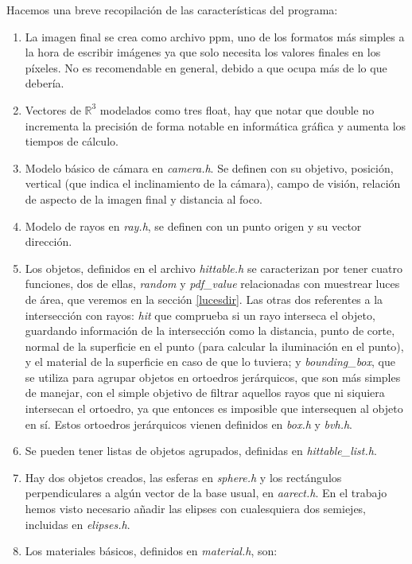 \documentclass{scrbook}
\begin{document}
Hacemos una breve recopilación de las características del programa:
\begin{enumerate}
	\item La imagen final se crea como archivo ppm, uno de los formatos más simples a la hora de escribir imágenes ya que solo necesita los valores finales en los píxeles. No es recomendable en general, debido a que ocupa más de lo que debería.
	\item Vectores de $\mathds{R}^3$ modelados como tres float, hay que notar que double no incrementa la precisión de forma notable en informática gráfica y aumenta los tiempos de cálculo.
	\item Modelo básico de cámara en \textit{camera.h}. Se definen con su objetivo, posición, vertical (que indica el inclinamiento de la cámara), campo de visión, relación de aspecto de la imagen final y distancia al foco.
	\item Modelo de rayos en \textit{ray.h}, se definen con un punto origen y su vector dirección.
	\item Los objetos, definidos en el archivo \textit{hittable.h} se caracterizan por tener cuatro funciones, dos de ellas, \textit{random} y \textit{pdf\_value}  relacionadas con muestrear luces de área, que veremos en la sección \ref{lucesdir}. Las otras dos referentes a la intersección con rayos: \textit{hit} que comprueba si un rayo interseca el objeto, guardando información de la intersección como la distancia, punto de corte, normal de la superficie en el punto (para calcular la iluminación en el punto), y el material de la superficie en caso de que lo tuviera; y \textit{bounding\_box}, que se utiliza para agrupar objetos en ortoedros jerárquicos, que son más simples de manejar, con el simple objetivo de filtrar aquellos rayos que ni siquiera intersecan el ortoedro, ya que entonces es imposible que intersequen al objeto en sí. Estos ortoedros jerárquicos vienen definidos en \textit{box.h} y \textit{bvh.h}.
	\item Se pueden tener listas de objetos agrupados, definidas en \textit{hittable\_list.h}.
	\item Hay dos objetos creados, las esferas en \textit{sphere.h} y los rectángulos perpendiculares a algún vector de la base usual, en \textit{aarect.h}. En el trabajo hemos visto necesario añadir las elipses con cualesquiera dos semiejes, incluidas en \textit{elipses.h}. 
	\item Los materiales básicos, definidos en \textit{material.h}, son:
	\begin{itemize}

\end{itemize}
\end{enumerate}
\end{document}
